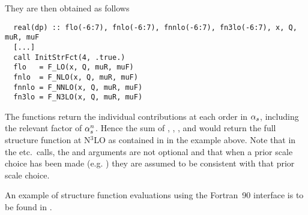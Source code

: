 %
They are then obtained as follows
\begin{lstlisting}
  real(dp) :: flo(-6:7), fnlo(-6:7), fnnlo(-6:7), fn3lo(-6:7), x, Q, muR, muF
  [...]
  call InitStrFct(4, .true.)
  flo   = F_LO(x, Q, muR, muF)
  fnlo  = F_NLO(x, Q, muR, muF)
  fnnlo = F_NNLO(x, Q, muR, muF)
  fn3lo = F_N3LO(x, Q, muR, muF)
\end{lstlisting}
The functions return the individual contributions at each order in
$\alpha_s$, including the relevant factor of $\alpha_s^n$.
%
Hence the sum of , , , and
 would return the full structure function at N$^3$LO as
contained in  in the example above.
%
Note that in the  etc.\ calls, the  and 
arguments are not optional and that when a prior scale choice has been
made (e.g. ) they are assumed to be consistent
with that prior scale choice.

An example of structure function evaluations using the Fortran~90
interface is to be found in
. 

